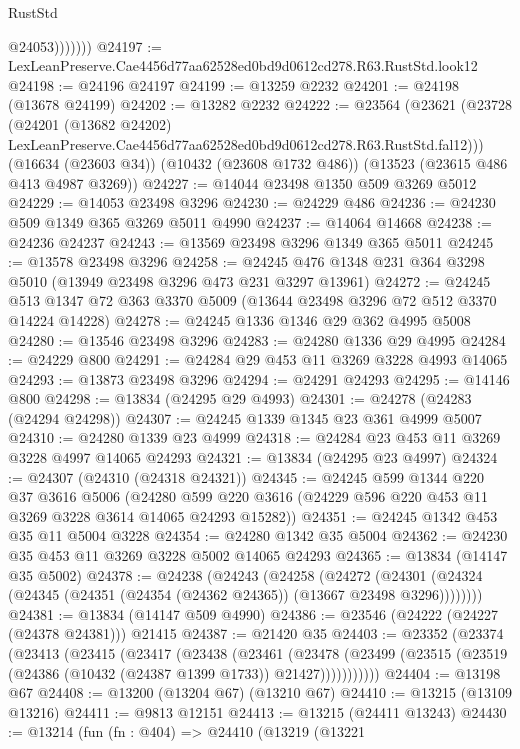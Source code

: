 \begin{lexlean}{RustStd}
\begin{coremodule}
                  @24053)))))))
@24197 := LexLeanPreserve.Cae4456d77aa62528ed0bd9d0612cd278.R63.RustStd.look12
@24198 := @24196 @24197
@24199 := @13259 @2232
@24201 := @24198 (@13678 @24199)
@24202 := @13282 @2232
@24222 := @23564
    (@23621
      (@23728
        (@24201
          (@13682 @24202)
          LexLeanPreserve.Cae4456d77aa62528ed0bd9d0612cd278.R63.RustStd.fal12)))
    (@16634 (@23603 @34))
    (@10432 (@23608 @1732 @486))
    (@13523 (@23615 @486 @413 @4987 @3269))
@24227 := @14044 @23498 @1350 @509 @3269 @5012
@24229 := @14053 @23498 @3296
@24230 := @24229 @486
@24236 := @24230 @509 @1349 @365 @3269 @5011 @4990
@24237 := @14064 @14668
@24238 := @24236 @24237
@24243 := @13569 @23498 @3296 @1349 @365 @5011
@24245 := @13578 @23498 @3296
@24258 := @24245 @476 @1348 @231 @364 @3298 @5010 (@13949 @23498 @3296 @473 @231 @3297 @13961)
@24272 := @24245 @513 @1347 @72 @363 @3370 @5009 (@13644 @23498 @3296 @72 @512 @3370 @14224 @14228)
@24278 := @24245 @1336 @1346 @29 @362 @4995 @5008
@24280 := @13546 @23498 @3296
@24283 := @24280 @1336 @29 @4995
@24284 := @24229 @800
@24291 := @24284 @29 @453 @11 @3269 @3228 @4993 @14065
@24293 := @13873 @23498 @3296
@24294 := @24291 @24293
@24295 := @14146 @800
@24298 := @13834 (@24295 @29 @4993)
@24301 := @24278 (@24283 (@24294 @24298))
@24307 := @24245 @1339 @1345 @23 @361 @4999 @5007
@24310 := @24280 @1339 @23 @4999
@24318 := @24284 @23 @453 @11 @3269 @3228 @4997 @14065 @24293
@24321 := @13834 (@24295 @23 @4997)
@24324 := @24307 (@24310 (@24318 @24321))
@24345 := @24245
    @599
    @1344
    @220
    @37
    @3616
    @5006
    (@24280 @599 @220 @3616 (@24229 @596 @220 @453 @11 @3269 @3228 @3614 @14065 @24293 @15282))
@24351 := @24245 @1342 @453 @35 @11 @5004 @3228
@24354 := @24280 @1342 @35 @5004
@24362 := @24230 @35 @453 @11 @3269 @3228 @5002 @14065 @24293
@24365 := @13834 (@14147 @35 @5002)
@24378 := @24238
    (@24243
      (@24258
        (@24272
          (@24301 (@24324 (@24345 (@24351 (@24354 (@24362 @24365)) (@13667 @23498 @3296))))))))
@24381 := @13834 (@14147 @509 @4990)
@24386 := @23546 (@24222 (@24227 (@24378 @24381))) @21415
@24387 := @21420 @35
@24403 := @23352
    (@23374
      (@23413
        (@23415
          (@23417
            (@23438
              (@23461
                (@23478
                  (@23499 (@23515 (@23519 (@24386 (@10432 (@24387 @1399 @1733)) @21427)))))))))))
@24404 := @13198 @67
@24408 := @13200 (@13204 @67) (@13210 @67)
@24410 := @13215 (@13109 @13216)
@24411 := @9813 @12151
@24413 := @13215 (@24411 @13243)
@24430 := @13214
    (fun (fn : @404) =>
    @24410
      (@13219
        (@13221

\end{coremodule}
\end{lexlean}
